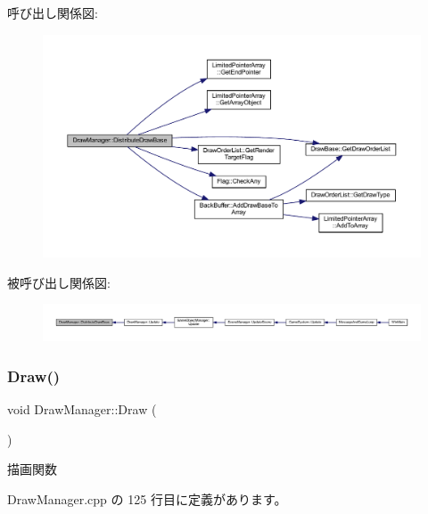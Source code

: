 呼び出し関係図\+:\nopagebreak
\begin{figure}[H]
\begin{center}
\leavevmode
\includegraphics[width=350pt]{class_draw_manager_a9a09cb524187bc11f1e4812a06fe46d6_cgraph}
\end{center}
\end{figure}
被呼び出し関係図\+:
\nopagebreak
\begin{figure}[H]
\begin{center}
\leavevmode
\includegraphics[width=350pt]{class_draw_manager_a9a09cb524187bc11f1e4812a06fe46d6_icgraph}
\end{center}
\end{figure}
\mbox{\label{class_draw_manager_a43372495e68d77a2698f211cf921b37e}} 
\subsubsection{\texorpdfstring{Draw()}{Draw()}}
{\footnotesize\ttfamily void Draw\+Manager\+::\+Draw (\begin{DoxyParamCaption}{ }\end{DoxyParamCaption})}



描画関数 



 Draw\+Manager.\+cpp の 125 行目に定義があります。

